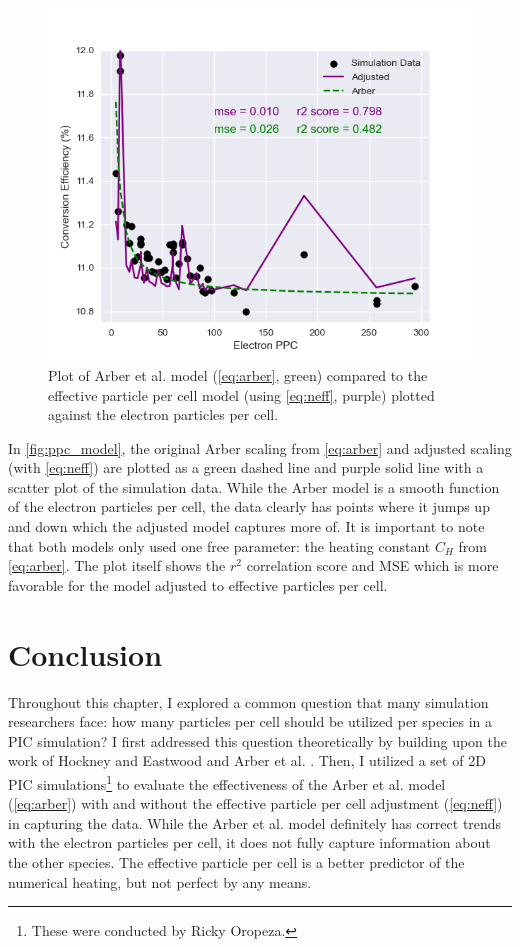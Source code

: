 \begin{figure}
	\includegraphics[width=0.9\linewidth]{planning/images/arber/L-E_1param_eppc.png}
	\caption{Plot of Arber et al. model (\autoref{eq:arber}, green) compared to the effective particle per cell model (using \autoref{eq:neff}, purple) plotted against the electron particles per cell.} \label{fig:ppc_model}
\end{figure}
 In \autoref{fig:ppc_model}, the original Arber scaling from \autoref{eq:arber} and adjusted scaling (with \autoref{eq:neff}) are plotted as a green dashed line and purple solid line with a scatter plot of the simulation data. While the Arber model is a smooth function of the electron particles per cell, the data clearly has points where it jumps up and down which the adjusted model captures more of. It is important to note that both models only used one free parameter: the heating constant $C_H$ from \autoref{eq:arber}. The plot itself shows the $r^2$ correlation score and \gls{MSE} which is more favorable for the model adjusted to effective particles per cell. 

\section{Conclusion}
Throughout this chapter, I explored a common question that many simulation researchers face: how many particles per cell should be utilized per species in a \gls{PIC} simulation? I first addressed this question theoretically by building upon the work of Hockney and Eastwood \cite{Hockney_1988_PIC} and Arber et al. \cite{Arber_2015_PPCF}. Then, I utilized a set of 2D \gls{PIC} simulations\footnote{These were conducted by Ricky Oropeza.} to evaluate the effectiveness of the Arber et al. model (\autoref{eq:arber}) with and without the effective particle per cell adjustment (\autoref{eq:neff}) in capturing the data. While the Arber et al. model definitely has correct trends with the electron particles per cell, it does not fully capture information about the other species. The effective particle per cell is a better predictor of the numerical heating, but not perfect by any means. 

